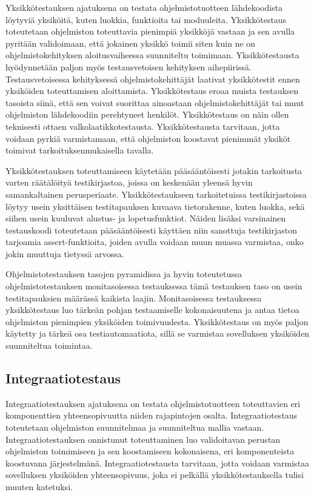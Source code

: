     Yksikkötestauksen ajatuksena on testata ohjelmistotuotteen lähdekoodista löytyviä yksiköitä, kuten luokkia, funktioita tai moduuleita.
    Yksikkötestaus toteutetaan ohjelmiston toteuttavia pienimpiä yksikköjä vastaan ja sen avulla pyritään validoimaan, että jokainen yksikkö toimii siten kuin ne on ohjelmistokehityksen aloitusvaiheessa suunniteltu toimimaan.
    Yksikkötestausta hyödynnetään paljon myös testausvetoisen kehityksen aihepiirissä.
    Testausvetoisessa kehityksessä ohjelmistokehittäjät laativat yksikkötestit ennen yksiköiden toteuttamisen aloittamista.
    Yksikkötestaus eroaa muista testauksen tasoista siinä, että sen voivat suorittaa ainoastaan ohjelmistokehittäjät tai muut ohjelmiston lähdekoodiin perehtyneet henkilöt.
    Yksikkötestaus on näin ollen teknisesti ottaen valkolaatikkotestausta.
    Yksikkötestausta tarvitaan, jotta voidaan pyrkiä varmistamaan, että ohjelmiston koostavat pienimmät yksiköt toimivat tarkoituksenmukaisella tavalla.

    Yksikkötestauksen toteuttamiseen käytetään pääsääntöisesti jotakin tarkoitusta varten räätälöityä testikirjastoa, joissa on keskenään yleensä hyvin samankaltainen perusperiaate.
    Yksikkötestaukseen tarkoitetuissa testikirjastoissa löytyy usein yksittäisen testitapauksen kuvaava tietorakenne, kuten luokka, sekä siihen usein kuuluvat alustus- ja lopetusfunktiot.
    Näiden lisäksi varsinainen testauskoodi toteutetaan pääsääntöisesti käyttäen niin sanottuja testikirjaston tarjoamia assert-funktioita, joiden avulla voidaan muun muassa varmistaa, onko jokin muuttuja tietyssä arvossa.

    Ohjelmistotestauksen tasojen pyramidissa ja hyvin toteutetussa ohjelmistotestauksen monitasoisessa testauksessa tämä testauksen taso on usein testitapauksien määrässä kaikista laajin.
    Monitasoisessa testauksessa yksikkötestaus luo tärkeän pohjan testaamiselle kokonaisuutena ja antaa tietoa ohjelmiston pienimpien yksiköiden toimivuudesta.
    Yksikkötestaus on myös paljon käytetty ja tärkeä osa testiautomaatiota, sillä se varmistaa sovelluksen yksiköiden suunniteltua toimintaa.

  \subsection{Integraatiotestaus} \label{ch:07_integraatiotestaus}

    Integraatiotestauksen ajatuksena on testata ohjelmistotuotteen toteuttavien eri komponenttien yhteensopivuutta niiden rajapintojen osalta.
    Integraatiotestaus toteutetaan ohjelmiston suunnitelmaa ja suunniteltua mallia vastaan.
    Integraatiotestauksen onnistunut toteuttaminen luo validoitavan perustan ohjelmiston toimimiseen ja sen koostamiseen kokonaisena, eri komponenteista koostuvana järjestelmänä.
    Integraatiotestausta tarvitaan, jotta voidaan varmistaa sovelluksen yksiköiden yhteensopivuus, joka ei pelkällä yksikkötestauksella tulisi muuten katetuksi.

